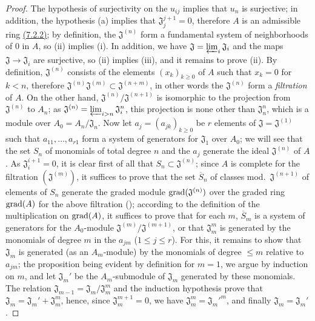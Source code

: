 \begin{proof}
\label{proof-0.7.2.7}
The hypothesis of surjectivity on the $u_{ij}$ implies that $u_n$ is surjective;
in addition, the hypothesis (a) implies that $\mathfrak{J}_j^{j+1}=0$, therefore
$A$ is an admissible ring \hyperref[0.7.2.2]{(7.2.2)}; by definition, the
$\mathfrak{J}^{(n)}$ form a fundamental system of neighborhoods of $0$ in $A$,
so (ii) implies (i). In addition, we have
$\mathfrak{J}=\varprojlim_i\mathfrak{J}_i$ and the maps
$\mathfrak{J}\to\mathfrak{J}_i$ are surjective, so (ii) implies (iii), and it
remains to prove (ii). By definition, $\mathfrak{J}^{(n)}$ consists of the
elements $(x_k)_{k\geqslant 0}$ of $A$ such that $x_k=0$ for $k<n$, therefore
$\mathfrak{J}^{(n)}\mathfrak{J}^{(m)}\subset\mathfrak{J}^{(n+m)}$, in other
words the $\mathfrak{J}^{(n)}$ form a {\em filtration} of $A$. On the other
hand, $\mathfrak{J}^{(n)}/\mathfrak{J}^{(n+1)}$ is isomorphic to the projection
from $\mathfrak{J}^{(n)}$ to $A_n$; as
$\mathfrak{J}^{(n)}=\varprojlim_{i>n}\mathfrak{J}_i^n$, this projection is none
other than $\mathfrak{J}_n^n$, which is a module over $A_0=A_n/\mathfrak{J}_n$.
Now let $a_j=(a_{jk})_{k\geqslant 0}$ be $r$ elements of
$\mathfrak{J}=\mathfrak{J}^{(1)}$ such that $a_{11},\dots,a_{r1}$ form a system
of generators for $\mathfrak{J}_1$ over $A_0$; we will see that the set $S_n$ of
monomials of total degree $n$ and the $a_j$ generate the ideal
$\mathfrak{J}^{(n)}$ of $A$. As $\mathfrak{J}_i^{i+1}=0$, it is clear first of
all that $S_n\subset\mathfrak{J}^{(n)}$; since $A$ is complete for the
filtration $(\mathfrak{J}^{(m)})$, it suffices to prove that the set
$\overline{S}_n$ of classes mod.~$\mathfrak{J}^{(n+1)}$ of elements of $S_n$
generate the graded module ${\mathop{\mathrm{grad}}\nolimits}(\mathfrak{J}^{(n)})$ over the graded ring
${\mathop{\mathrm{grad}}\nolimits}(A)$ for the above filtration (\cite[p.~18--06, lemme]{I-1}); according to
the definition of the multiplication on ${\mathop{\mathrm{grad}}\nolimits}(A)$,
it suffices to prove that for each $m$, $\overline{S}_m$ is a system of
generators for the $A_0$-module $\mathfrak{J}^{(m)}/\mathfrak{J}^{(m+1)}$, or
that $\mathfrak{J}_m^m$ is generated by the monomials of degree $m$ in the
$a_{jm}$ ($1\leqslant j\leqslant r$). For this, it remains to show that
$\mathfrak{J}_m$ is generated (as an $A_m$-module) by the monomials of degree
$\leqslant m$ relative to $a_{jm}$; the proposition being evident by definition
for $m=1$, we argue by induction on $m$, and let $\mathfrak{J}_m'$ be the
$A_m$-submodule of $\mathfrak{J}_m$ generated by these monomials. The relation
$\mathfrak{J}_{m-1}=\mathfrak{J}_m/\mathfrak{J}_m^m$ and the induction
hypothesis prove that $\mathfrak{J}_m=\mathfrak{J}_m'+\mathfrak{J}_m^m$, hence,
since $\mathfrak{J}_m^{m+1}=0$, we have $\mathfrak{J}_m^m={\mathfrak{J}_m'}^m$,
and finally $\mathfrak{J}_m=\mathfrak{J}_m'$.
\end{proof}

